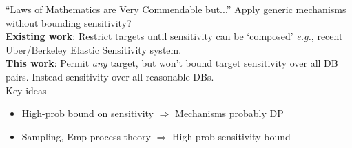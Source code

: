 \documentclass{beamer}
\newcommand{\eg}{\emph{e.g.},\xspace}
\begin{document}
\begin{frame}{``Laws of Mathematics are Very Commendable but...''}
\pause
Apply generic mechanisms without bounding sensitivity?\\[1em]

\textbf{Existing work}: \alert{Restrict targets} until sensitivity can be `composed' \eg recent Uber/Berkeley Elastic Sensitivity system. \\[1em]

\textbf{This work}: Permit \emph{any} target, but won't bound target sensitivity over all DB pairs. Instead \alert{sensitivity over all reasonable DBs}. \\[1.0em]

Key ideas
\begin{itemize}
	\item High-prob bound on sensitivity $\Rightarrow$ Mechanisms \alert{probably DP}
	\item \alert{Sampling}, \alert{Emp process theory} $\Rightarrow$ High-prob sensitivity bound 
\end{itemize}
\end{frame}
\end{document}
